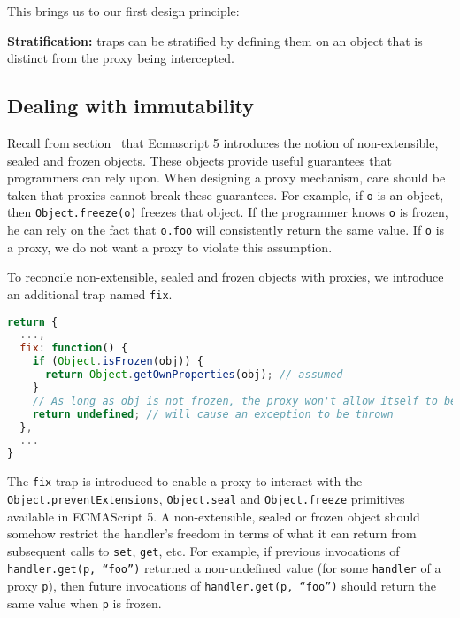 \documentclass{acm_proc_article-sp}
\begin{document}
This brings us to our first design principle:

\textbf{Stratification:} traps can be stratified by defining them on an object that is distinct from the proxy being intercepted.

\subsection{Dealing with immutability}
\label{sub:immutability}

Recall from section~\cite{sub:introspection_in_js} that Ecmascript 5 introduces the notion of non-extensible, sealed and frozen objects. These objects provide useful guarantees that programmers can rely upon. When designing a proxy mechanism, care should be taken that proxies cannot break these guarantees. For example, if \texttt{o} is an object, then \texttt{Object.freeze(o)} freezes that object. If the programmer knows \texttt{o} is frozen, he can rely on the fact that \texttt{o.foo} will consistently return the same value. If \texttt{o} is a proxy, we do not want a proxy to violate this assumption.

To reconcile non-extensible, sealed and frozen objects with proxies, we introduce an additional trap named \texttt{fix}.


\begin{lstlisting}[language=javascript]
return {
  ...,
  fix: function() {
    if (Object.isFrozen(obj)) {
      return Object.getOwnProperties(obj); // assumed
    }
    // As long as obj is not frozen, the proxy won't allow itself to be fixed
    return undefined; // will cause an exception to be thrown
  },
  ...
}
\end{lstlisting}

The \texttt{fix} trap is introduced to enable a proxy to interact with the \texttt{Object.preventExtensions}, \texttt{Object.seal} and \texttt{Object.freeze} primitives available in ECMAScript 5. A non-extensible, sealed or frozen object should somehow restrict the handler’s freedom in terms of what it can return from subsequent calls to \texttt{set}, \texttt{get}, etc. For example, if previous invocations of \texttt{handler.get(p, ``foo'')} returned a non-undefined value (for some \texttt{handler} of a proxy \texttt{p}), then future invocations of \texttt{handler.get(p, ``foo'')} should return the same value when \texttt{p} is frozen.
\end{document}
